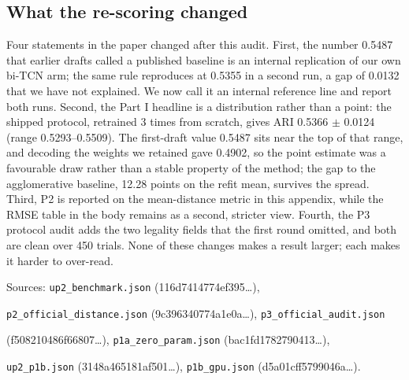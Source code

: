 \subsection*{What the re-scoring changed}
Four statements in the paper changed after this audit. First, the number 0.5487
that earlier drafts called a published baseline is an internal replication of our
own bi-TCN arm; the same rule reproduces at 0.5355 in a second run, a gap of
0.0132 that we have not explained. We now call it an internal reference line and
report both runs. Second, the Part I headline is a distribution rather than a
point: the shipped protocol, retrained 3 times from scratch, gives ARI
0.5366 $\pm$ 0.0124 (range 0.5293--0.5509).
The first-draft value 0.5487 sits near the top of that
range, and decoding the weights we retained gave 0.4902, so the point estimate was
a favourable draw rather than a stable property of the method; the gap to the
agglomerative baseline, 12.28 points on the refit mean,
survives the spread. Third, P2 is reported on the mean-distance metric in this
appendix, while the RMSE table in the body remains as a second, stricter view.
Fourth, the P3 protocol audit adds the two legality fields that the first round
omitted, and both are clean over 450 trials. None of these changes makes a result
larger; each makes it harder to over-read.

\noindent\footnotesize Sources: \texttt{up2\_benchmark.json} (116d7414774ef395\ldots),
\par\noindent\footnotesize\texttt{p2\_official\_distance.json} (9c396340774a1e0a\ldots), \texttt{p3\_official\_audit.json}
\par\noindent\footnotesize(f508210486f66807\ldots), \texttt{p1a\_zero\_param.json} (bac1fd1782790413\ldots),
\par\noindent\footnotesize\texttt{up2\_p1b.json} (3148a465181af501\ldots), \texttt{p1b\_gpu.json} (d5a01cff5799046a\ldots).

